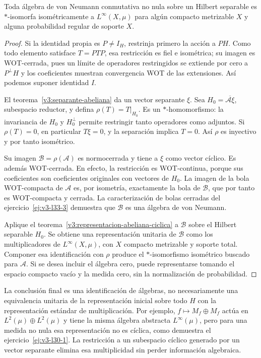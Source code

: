 \begin{teorema}\label{v3:caracterizacion-abeliana}
Toda álgebra de von Neumann conmutativa no nula sobre un Hilbert separable es $*$-isomorfa isométricamente a $L^\infty(X,\mu)$ para algún compacto metrizable $X$ y alguna probabilidad regular de soporte $X$.
\end{teorema}
\begin{proof}
Si la identidad propia es $P\ne I_H$, restrinja primero la acción a $PH$. Como todo elemento satisface $T=PTP$, esa restricción es fiel e isométrica; su imagen es WOT-cerrada, pues un límite de operadores restringidos se extiende por cero a $P^\perp H$ y los coeficientes muestran convergencia WOT de las extensiones. Así podemos suponer identidad $I$.

El teorema~\ref{v3:separante-abeliana} da un vector separante $\xi$. Sea $H_0=\overline{\mathcal A\xi}$, subespacio reductor, y defina $\rho(T)=T|_{H_0}$. Es un $*$-homomorfismo: la invariancia de $H_0$ y $H_0^\perp$ permite restringir tanto operadores como adjuntos. Si $\rho(T)=0$, en particular $T\xi=0$, y la separación implica $T=0$. Así $\rho$ es inyectivo y por tanto isométrico.

Su imagen $\mathcal B=\rho(\mathcal A)$ es normocerrada y tiene a $\xi$ como vector cíclico. Es además WOT-cerrada. En efecto, la restricción es WOT-continua, porque sus coeficientes son coeficientes originales con vectores de $H_0$. La imagen de la bola WOT-compacta de $\mathcal A$ es, por isometría, exactamente la bola de $\mathcal B$, que por tanto es WOT-compacta y cerrada. La caracterización de bolas cerradas del ejercicio~\ref{ej:v3-l33-3} demuestra que $\mathcal B$ es una álgebra de von Neumann.

Aplique el teorema~\ref{v3:representacion-abeliana-ciclica} a $\mathcal B$ sobre el Hilbert separable $H_0$. Se obtiene una representación unitaria de $\mathcal B$ como los multiplicadores de $L^\infty(X,\mu)$, con $X$ compacto metrizable y soporte total. Componer esa identificación con $\rho$ produce el $*$-isomorfismo isométrico buscado para $\mathcal A$. Si se desea incluir el álgebra cero, puede representarse tomando el espacio compacto vacío y la medida cero, sin la normalización de probabilidad.
\end{proof}

La conclusión final es una identificación de álgebras, no necesariamente una equivalencia unitaria de la representación inicial sobre todo $H$ con la representación estándar de multiplicación. Por ejemplo, $f\mapsto M_f\oplus M_f$ actúa en $L^2(\mu)\oplus L^2(\mu)$ y tiene la misma álgebra abstracta $L^\infty(\mu)$, pero para una medida no nula esa representación no es cíclica, como demuestra el ejercicio~\ref{ej:v3-l30-1}. La restricción a un subespacio cíclico generado por un vector separante elimina esa multiplicidad sin perder información algebraica.


